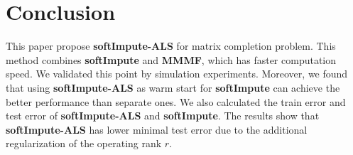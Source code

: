 \documentclass[11pt]{article}
\begin{document}
\section{Conclusion}
This paper propose \textbf{softImpute-ALS} for matrix completion problem. This method combines \textbf{softImpute} and \textbf{MMMF}, which has faster computation speed. We validated this point by simulation experiments. Moreover, we found that using  \textbf{softImpute-ALS} as warm start for \textbf{softImpute} can achieve the better performance than separate ones. We also calculated the train error and test error of  \textbf{softImpute-ALS} and \textbf{softImpute}. The results show that \textbf{softImpute-ALS} has lower minimal test error due to the additional regularization of the operating rank $r$.





\end{document}
